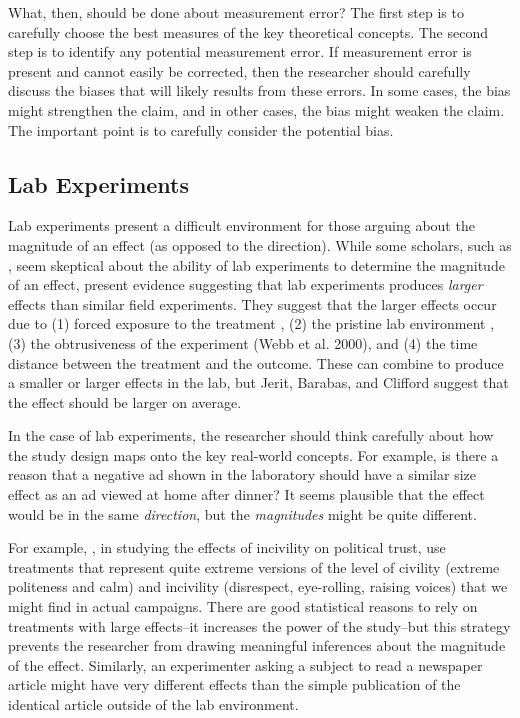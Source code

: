\documentclass[12pt]{article}
\begin{document}

What, then, should be done about measurement error? The first step is to carefully choose the best measures of the key theoretical concepts. The second step is to identify any potential measurement error. If measurement error is present and cannot easily be corrected, then the researcher should carefully discuss the biases that will likely results from these errors. In some cases, the bias might strengthen the claim, and in other cases, the bias might weaken the claim. The important point is to carefully consider the potential bias.

\subsection*{Lab Experiments}


Lab experiments present a difficult environment for those arguing about the magnitude of an effect (as opposed to the direction). While some scholars, such as \cite{Gerber2011}, seem skeptical about the ability of lab experiments to determine the magnitude of an effect, \cite{JeritBarabasClifford2013} present evidence suggesting that lab experiments produces \textit{larger} effects than similar field experiments. They suggest that the larger effects occur due to (1) forced exposure to the treatment \citep{GainesKuklinski2011}, (2) the pristine lab environment \citep{Kinder2007}, (3) the obtrusiveness of the experiment (Webb et al. 2000), and (4) the time distance between the treatment and the outcome. These can combine to produce a smaller or larger effects in the lab, but Jerit, Barabas, and Clifford suggest that the effect should be larger on average.

In the case of lab experiments, the researcher should think carefully about how the study design maps onto the key real-world concepts. For example, is there a reason that a negative ad shown in the laboratory should have a similar size effect as an ad viewed at home after dinner? It seems plausible that the effect would be in the same \emph{direction}, but the \emph{magnitudes} might be quite different.

For example, \cite{MutzReeves2005}, in studying the effects of incivility on political trust, use treatments that represent quite extreme versions of the level of civility (extreme politeness and calm) and incivility (disrespect, eye-rolling, raising voices) that we might find in actual campaigns. There are good statistical reasons to rely on treatments with large effects--it increases the power of the study--but this strategy prevents the researcher from drawing meaningful inferences about the magnitude of the effect. Similarly, an experimenter asking a subject to read a newspaper article might have very different effects than the simple publication of the identical article outside of the lab environment.
\end{document}
